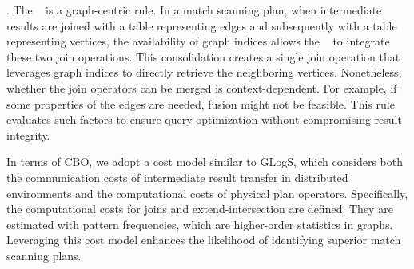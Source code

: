 \fusionrule. 
The \fusionrule~ is a graph-centric rule. 
In a match scanning plan, when intermediate results are joined with a table representing edges and subsequently with a table representing vertices, the availability of graph indices allows the \fusionrule~ to integrate these two join operations. 
This consolidation creates a single join operation that leverages graph indices to directly retrieve the neighboring vertices.
Nonetheless, whether the join operators can be merged is context-dependent. 
For example, if some properties of the edges are needed, fusion might not be feasible.
This rule evaluates such factors to ensure query optimization without compromising result integrity.



In terms of CBO, we adopt a cost model similar to GLogS, which considers both the communication costs of intermediate result transfer in distributed environments and the computational costs of physical plan operators. 
Specifically, the computational costs for joins and extend-intersection are defined.
They are estimated with pattern frequencies, which are higher-order statistics in graphs.
Leveraging this cost model enhances the likelihood of identifying superior match scanning plans.